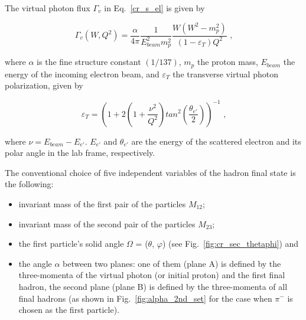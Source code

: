 The virtual photon flux $\Gamma_{v}$ in Eq.~\eqref{cr_s_el} is given by

\begin{equation}
\Gamma_{v}(W,Q^2) =
\frac{\alpha}{4\pi}\frac{1}{E_{beam}^{2}m_{p}^{2}}\frac{W(W^{2}-m_{p}^{2})}
{(1-\varepsilon_{T})Q^{2}} \textrm{ ,}
\label{flux}
\end{equation}

where $\alpha$ is the fine structure constant $\left(1/137\right)$, $m_{p}$ the proton mass, $E_{beam}$ the energy of the incoming electron beam, and $\varepsilon_{T}$ the transverse virtual photon polarization, given by

\begin{equation}
\varepsilon_{T} = \left( 1 + 2\left( 1 +
\frac{\nu^{2}}{Q^{2}} \right)
tan^{2}\left(\frac{\theta_{e'}}{2}\right) \right)^{-1} \textrm{ ,}
\label{eq:polarization}
\end{equation}

where $\nu = E_{beam} - E_{e'}$. $E_{e'}$ and $\theta_{e'}$ are the energy of the scattered electron and its polar angle in the lab frame, respectively. 

The conventional choice of five independent variables of the hadron final state is the following:

\begin{itemize}
\item invariant mass of the first pair of the
particles $M_{12}$;
\item invariant mass of the second pair of the
particles $M_{23}$;
\item the first particle's solid angle $\Omega$ = ($\theta$, $\varphi$) (see Fig.~\ref{fig:cr_sec_thetaphi}) and
\item the angle $\alpha$ between two planes: one of
them (plane A) is defined by the three-momenta of
the virtual photon (or initial proton) and the first final hadron, the second
plane (plane B) is defined by the three-momenta of all final hadrons (as shown in  Fig.~\ref{fig:alpha_2nd_set} for the case when $\pi^-$ is chosen as the first particle).
\end{itemize}








